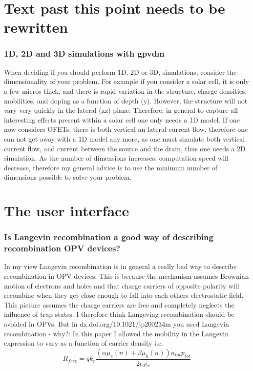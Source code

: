 
\section{Text past this point needs to be rewritten}





\newpage



\subsubsection{1D, 2D and 3D simulations with gpvdm}

When deciding if you should perform 1D, 2D or 3D, simulations, consider the dimensionality of your problem.  For example if you consider a solar cell, it is only a few micros thick, and there is rapid variation in the structure, charge densities, mobilities, and doping as a function of depth (y).  However, the structure will not vary very quickly in the lateral (xz) plane.  Therefore, in general  to capture all interesting effects present within a solar cell one only needs a 1D model.  If one now considers OFETs, there is both vertical an lateral current flow, therefore one can not get away with a 1D model any more, as one must simulate both vertical current flow, and current between the source and the drain, thus one needs a 2D simulation.  As the number of dimensions increases, computation speed will decrease, therefore my general advice is to use the minimum number of dimensions possible to solve your problem.


\section{The user interface}
\subsubsection{Is Langevin recombination a good way of describing recombination OPV devices?}
In my view Langevin recombination is in general a really bad way to describe recombination in OPV devices.  This is because the mechanism assumes Brownian motion of electrons and holes and that charge carriers of opposite polarity will recombine when they get close enough to fall into each others electrostatic field.  This picture assumes the charge carriers are free and completely neglects the influence of trap states.  I therefore think Langeving recombination should be avoided in OPVs.
But in dx.doi.org/10.1021/jp200234m you used Langevin recombination - why?: In this paper I allowed the mobility in the Langevin expression to vary as a function of carrier density i.e.
\begin{equation}
R_{free}=q k_{r}\frac{(\alpha \mu_e(n)+\beta \mu_h(n)) n_{tot} p_{tot}}{2\epsilon_0\epsilon_r}
\end{equation}

